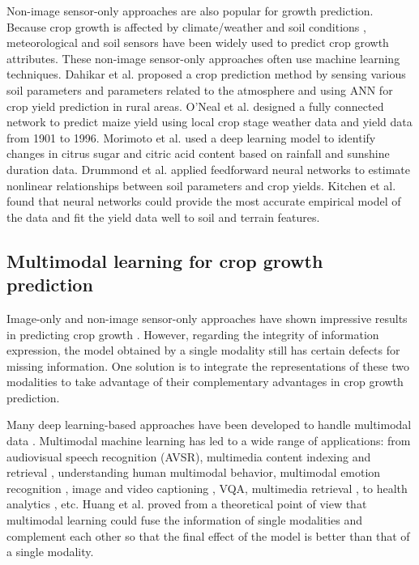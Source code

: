 \documentclass[acmsmall, screen]{acmart}
\begin{document}
Non-image sensor-only approaches are also popular for growth prediction. Because crop growth is affected by climate/weather and soil conditions \cite{fortin_site-specific_2011,campbell_effect_1988,ehret_neural_2011}, meteorological and soil sensors have been widely used to predict crop growth attributes. These non-image sensor-only approaches often use machine learning techniques. Dahikar et al. \cite{dahikar_agricultural_2014} proposed a crop prediction method by sensing various soil parameters and parameters related to the atmosphere and using ANN for crop yield prediction in rural areas. O'Neal et al. \cite{oneal_neural_2002} designed a fully connected network to predict maize yield using local crop stage weather data and yield data from 1901 to 1996. Morimoto et al. \cite{morimoto_dynamic_2007} used a deep learning model to identify changes in citrus sugar and citric acid content based on rainfall and sunshine duration data. Drummond et al. \cite{drummond_application_1998} applied feedforward neural networks to estimate nonlinear relationships between soil parameters and crop yields. Kitchen et al. \cite{kitchen_soil_2003} found that neural networks could provide the most accurate empirical model of the data and fit the yield data well to soil and terrain features.

\subsection{Multimodal learning for crop growth prediction}
Image-only and non-image sensor-only approaches have shown impressive results in predicting crop growth \cite{padilla_proximal_2018}. However, regarding the integrity of information expression, the model obtained by a single modality still has certain defects for missing information. One solution is to integrate the representations of these two modalities to take advantage of their complementary advantages in crop growth prediction.

Many deep learning-based approaches have been developed to handle multimodal data \cite{sengupta_review_2020, 8269806, liang_foundations_2023}. Multimodal machine learning has led to a wide range of applications: from audiovisual speech recognition (AVSR)\cite{yuhas_integration_1989}, multimedia content indexing and retrieval \cite{snoek_multimodal_2005}, understanding human multimodal behavior, multimodal emotion recognition \cite{chen_heu_2021}, image and video captioning \cite{lei_video_2021}, VQA\cite{long_improving_2021}, multimedia retrieval \cite{souza_online_2021}, to health analytics \cite{yazdavar_multimodal_2020}, etc. Huang et al. \cite{huang_what_2021} proved from a theoretical point of view that multimodal learning could fuse the information of single modalities and complement each other so that the final effect of the model is better than that of a single modality.
\end{document}

